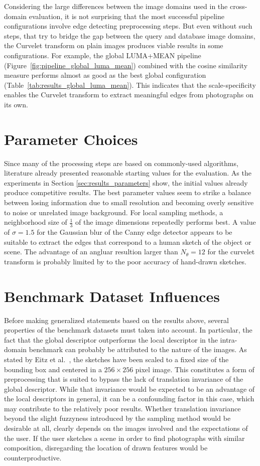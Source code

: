 Considering the large differences between the image domains used in the
cross-domain evaluation, it is not surprising that the most successful pipeline
configurations involve edge detecting preprocessing steps. But even without
such steps, that try to bridge the gap between the query and database image
domains, the Curvelet transform on plain images produces viable results in some
configurations. For example, the global LUMA+MEAN pipeline
(Figure~\ref{fig:pipeline_global_luma_mean}) combined with the cosine
similarity measure performs almost as good as the best global configuration
(Table~\ref{tab:results_global_luma_mean}). This indicates that the
scale-specificity enables the Curvelet transform to extract meaningful edges
from photographs on its own.

\section{Parameter Choices}

Since many of the processing steps are based on commonly-used algorithms,
literature already presented reasonable starting values for the evaluation. As
the experiments in Section \ref{sec:results_parameters} show, the initial
values already produce competitive results. The best parameter values seem to
strike a balance between losing information due to small resolution and
becoming overly sensitive to noise or unrelated image background. For local
sampling methods, a neighborhood size of $\frac{1}{3}$ of the image dimensions
repeatedly performs best. A value of $\sigma=1.5$ for the Gaussian blur of the
Canny edge detector appears to be suitable to extract the edges that correspond
to a human sketch of the object or scene. The advantage of an angluar resultion
larger than $N_{\theta}=12$ for the curvelet transform is probably limited by
to the poor accuracy of hand-drawn sketches.

\section{Benchmark Dataset Influences}

Before making generalized statements based on the results above, several
properties of the benchmark datasets must taken into account. In particular,
the fact that the global descriptor outperforms the local descriptor in the
intra-domain benchmark can probably be attributed to the nature of the images.
As stated by Eitz et al.\ \autocite{eitz_how_2012}, the sketches have been
scaled to a fixed size of the bounding box and centered in a $256 \times 256$
pixel image. This constitutes a form of preprocessing that is suited to bypass
the lack of translation invariance of the global descriptor. While that
invariance would be expected to be an advantage of the local descriptors in
general, it can be a confounding factor in this case, which may contribute to
the relatively poor results. Whether translation invariance beyond the
slight fuzzyness introduced by the sampling method would be desirable at all,
clearly depends on the images involved and the expectations of the user. If the
user sketches a scene in order to find photographs with similar composition,
disregarding the location of drawn features would be counterproductive.

